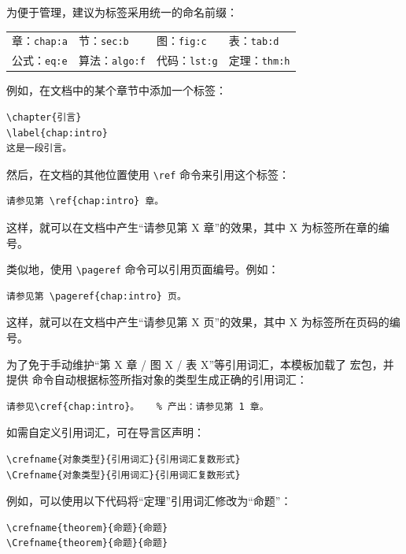 为便于管理，建议为标签采用统一的命名前缀：
\begin{center}
\begin{tabular}{llll}
  \toprule
  章：\verb|chap:a| & 节：\verb|sec:b| & 图：\verb|fig:c| & 表：\verb|tab:d| \\
  公式：\verb|eq:e| & 算法：\verb|algo:f| & 代码：\verb|lst:g| & 定理：\verb|thm:h| \\
  \bottomrule
\end{tabular}
\end{center}

例如，在文档中的某个章节中添加一个标签：

\begin{Verbatim}
\chapter{引言}
\label{chap:intro}
这是一段引言。
\end{Verbatim}

然后，在文档的其他位置使用 \verb|\ref| 命令来引用这个标签：

\begin{Verbatim}
请参见第 \ref{chap:intro} 章。
\end{Verbatim}

这样，就可以在文档中产生“请参见第 X 章”的效果，其中 X 为标签所在章的编号。

类似地，使用 \verb|\pageref| 命令可以引用页面编号。例如：

\begin{Verbatim}
请参见第 \pageref{chap:intro} 页。
\end{Verbatim}

这样，就可以在文档中产生“请参见第 X 页”的效果，其中 X 为标签所在页码的编号。

为了免于手动维护“第 X 章 / 图 X / 表 X”等引用词汇，本模板加载了  宏包，并提供  命令自动根据标签所指对象的类型生成正确的引用词汇：

\begin{Verbatim}
请参见\cref{chap:intro}。   % 产出：请参见第 1 章。
\end{Verbatim}

如需自定义引用词汇，可在导言区声明：

\begin{Verbatim}
\crefname{对象类型}{引用词汇}{引用词汇复数形式}
\Crefname{对象类型}{引用词汇}{引用词汇复数形式}
\end{Verbatim}

例如，可以使用以下代码将“定理”引用词汇修改为“命题”：
\begin{Verbatim}
\crefname{theorem}{命题}{命题}
\Crefname{theorem}{命题}{命题}
\end{Verbatim}

